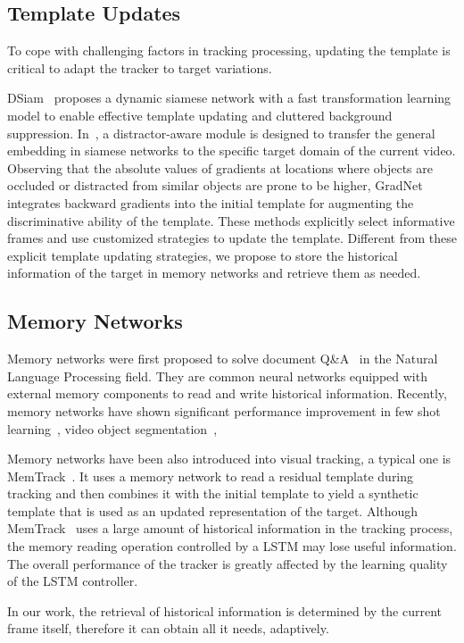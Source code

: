 \documentclass[final]{cvpr}
\begin{document}
\subsection{Template Updates}
To cope with challenging factors in tracking processing, updating the template is critical to adapt the tracker to target variations.
\par
DSiam~\cite{guo2017learning} proposes a dynamic siamese network with a fast transformation learning model to enable effective template updating and cluttered background suppression.
In~\cite{zhu2018distractor}, a distractor-aware module is designed to transfer the general embedding in siamese networks to the specific target domain of the current video.
Observing that the absolute values of gradients at locations where objects are occluded or distracted from similar objects are prone to be higher, GradNet~\cite{li2019gradnet} integrates backward gradients into the initial template for augmenting the discriminative ability of the template.
These methods explicitly select informative frames and use customized strategies to update the template.
Different from these explicit template updating strategies, we propose to store the historical information of the target in memory networks and retrieve them as needed.

\subsection{Memory Networks}
Memory networks were first proposed to solve document Q\&A~\cite{weston2014memory,sukhbaatar2015end,miller2016key,kumar2016ask} in the Natural Language Processing field.
They are common neural networks equipped with external memory components to read and write historical information.
Recently, memory networks have shown significant performance improvement in few shot learning~\cite{santoro2016meta,lu2020video}, video object segmentation~\cite{oh2019video,lu2020video}, \etc
\par
Memory networks have been also introduced into visual tracking, a typical one is MemTrack~\cite{yang2018learning}.
It uses a memory network to read a residual template during tracking and then combines it with the initial template to yield a synthetic template that is used as an updated representation of the target.
Although MemTrack~\cite{yang2018learning} uses a large amount of historical information in the tracking process, the memory reading operation controlled by a LSTM may lose useful information.
The overall performance of the tracker is greatly affected by the learning quality of the LSTM controller.
\par
In our work, the retrieval of historical information is determined by the current frame itself, therefore it can obtain all it needs, adaptively.
\end{document}
